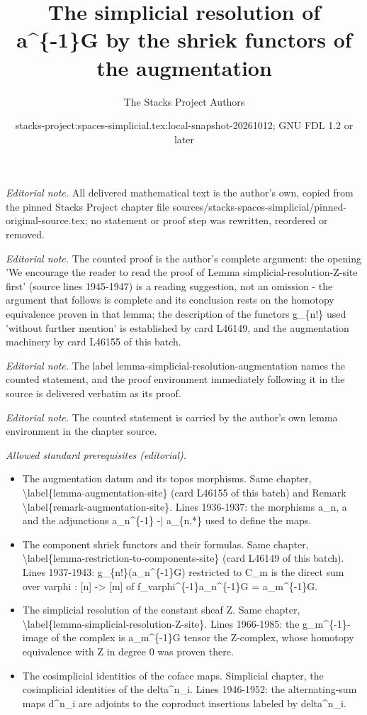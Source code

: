 \documentclass{stacks-project}
\title{The simplicial resolution of a\textasciicircum{}\{-1\}G by the shriek functors of the augmentation}
\author{The Stacks Project Authors}
\date{stacks-project:spaces-simplicial.tex:local-snapshot-20261012; GNU FDL 1.2 or later}
\theoremstyle{plain}
\theoremstyle{definition}
\theoremstyle{remark}
\numberwithin{equation}{subsection}
\begin{document}
\maketitle
\noindent\textit{Editorial note.} All delivered mathematical text is the author's own, copied from the pinned Stacks Project chapter file sources/stacks-spaces-simplicial/pinned-original-source.tex; no statement or proof step was rewritten, reordered or removed.\par\medskip
\noindent\textit{Editorial note.} The counted proof is the author's complete argument: the opening 'We encourage the reader to read the proof of Lemma simplicial-resolution-Z-site first' (source lines 1945-1947) is a reading suggestion, not an omission - the argument that follows is complete and its conclusion rests on the homotopy equivalence proven in that lemma; the description of the functors g\_\{n!\} used 'without further mention' is established by card L46149, and the augmentation machinery by card L46155 of this batch.\par\medskip
\noindent\textit{Editorial note.} The label lemma-simplicial-resolution-augmentation names the counted statement, and the proof environment immediately following it in the source is delivered verbatim as its proof.\par\medskip
\noindent\textit{Editorial note.} The counted statement is carried by the author's own lemma environment in the chapter source.\par\medskip
\noindent\textit{Allowed standard prerequisites (editorial).}\begin{itemize}
\item The augmentation datum and its topos morphisms. Same chapter, \textbackslash{}label\{lemma-augmentation-site\} (card L46155 of this batch) and Remark \textbackslash{}label\{remark-augmentation-site\}. Lines 1936-1937: the morphisms a\_n, a and the adjunctions a\_n\textasciicircum{}\{-1\} -| a\_\{n,*\} used to define the maps.
\item The component shriek functors and their formulas. Same chapter, \textbackslash{}label\{lemma-restriction-to-components-site\} (card L46149 of this batch). Lines 1937-1943: g\_\{n!\}(a\_n\textasciicircum{}\{-1\}G) restricted to C\_m is the direct sum over varphi : [n] -> [m] of f\_varphi\textasciicircum{}\{-1\}a\_n\textasciicircum{}\{-1\}G = a\_m\textasciicircum{}\{-1\}G.
\item The simplicial resolution of the constant sheaf Z. Same chapter, \textbackslash{}label\{lemma-simplicial-resolution-Z-site\}. Lines 1966-1985: the g\_m\textasciicircum{}\{-1\}-image of the complex is a\_m\textasciicircum{}\{-1\}G tensor the Z-complex, whose homotopy equivalence with Z in degree 0 was proven there.
\item The cosimplicial identities of the coface maps. Simplicial chapter, the cosimplicial identities of the delta\textasciicircum{}n\_i. Lines 1946-1952: the alternating-sum maps d\textasciicircum{}n\_i are adjoints to the coproduct insertions labeled by delta\textasciicircum{}n\_i.
\end{itemize}\medskip
\end{document}
